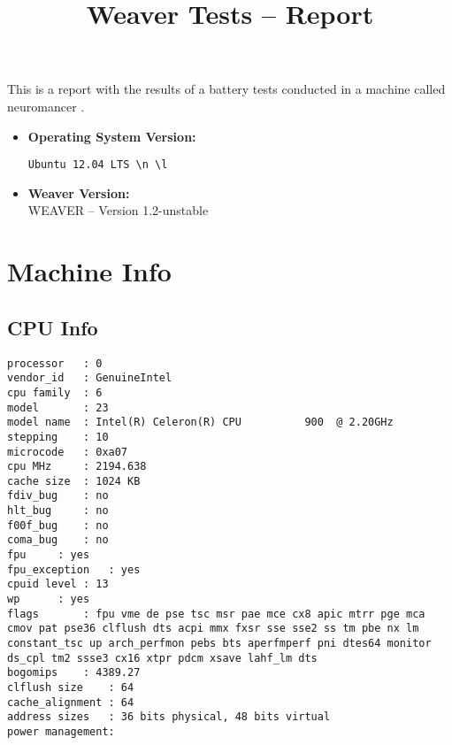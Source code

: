 \documentclass{article}
\title{Weaver Tests -- Report}
\begin{document}
\maketitle
This is a report with the results of a battery
tests conducted in a machine called 
neuromancer
.
\begin{itemize}
\item
\textbf{Operating System Version: }
\begin{verbatim}
Ubuntu 12.04 LTS \n \l

\end{verbatim}
\item
\textbf{Weaver Version: }\\
WEAVER -- Version 1.2-unstable
\end{itemize}
\section{Machine Info}
\subsection{CPU Info}
\begin{verbatim}
processor	: 0
vendor_id	: GenuineIntel
cpu family	: 6
model		: 23
model name	: Intel(R) Celeron(R) CPU          900  @ 2.20GHz
stepping	: 10
microcode	: 0xa07
cpu MHz		: 2194.638
cache size	: 1024 KB
fdiv_bug	: no
hlt_bug		: no
f00f_bug	: no
coma_bug	: no
fpu		: yes
fpu_exception	: yes
cpuid level	: 13
wp		: yes
flags		: fpu vme de pse tsc msr pae mce cx8 apic mtrr pge mca cmov pat pse36 clflush dts acpi mmx fxsr sse sse2 ss tm pbe nx lm constant_tsc up arch_perfmon pebs bts aperfmperf pni dtes64 monitor ds_cpl tm2 ssse3 cx16 xtpr pdcm xsave lahf_lm dts
bogomips	: 4389.27
clflush size	: 64
cache_alignment	: 64
address sizes	: 36 bits physical, 48 bits virtual
power management:

\end{verbatim}
\end{document}

